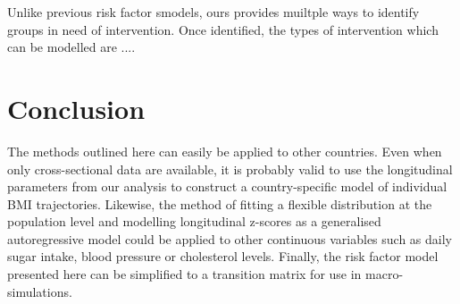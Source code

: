 \documentclass{imammb}
\numberwithin{equation}{section}
\begin{document}
Unlike previous risk factor smodels, ours provides muiltple ways to identify groups in need of intervention. Once identified, the types of intervention which can be modelled are ....

\section{Conclusion}
\label{sec:Conclusion}

The methods outlined here can easily be applied to other countries. Even when only cross-sectional data are available, it is probably valid to use the longitudinal parameters from our analysis to construct a country-specific model of individual BMI trajectories. Likewise, the method of fitting a flexible distribution at the population level and modelling longitudinal z-scores as a generalised autoregressive model could be applied to other continuous variables such as daily sugar intake, blood pressure or cholesterol levels. Finally, the risk factor model presented here can be simplified to a transition matrix for use in macro-simulations.
\end{document}

